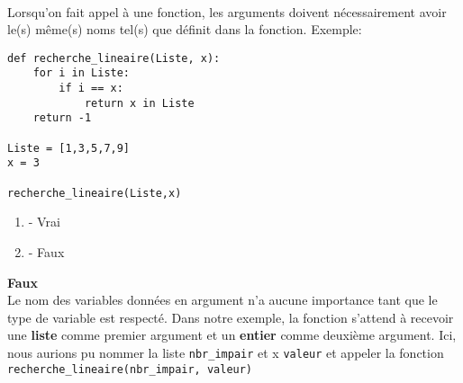 \begin{Exercice}[2 minutes]\\
Lorsqu'on fait appel à une fonction, les arguments doivent nécessairement avoir le(s) même(s) noms tel(s) que définit dans la fonction. Exemple:\\
\begin{lstlisting}
def recherche_lineaire(Liste, x):
    for i in Liste:
        if i == x:
            return x in Liste
    return -1

Liste = [1,3,5,7,9]
x = 3

recherche_lineaire(Liste,x)

\end{lstlisting}
\begin{enumerate}
    \item - Vrai
    \item - Faux
\end{enumerate}
\begin{solution}
    \textbf{Faux}\\
    Le nom des variables données en argument n'a aucune importance tant que le type de variable est respecté. Dans notre exemple, la fonction s'attend à recevoir  une \textbf{liste} comme premier argument et un \textbf{entier} comme deuxième argument. Ici, nous aurions pu nommer la liste \lstinline{nbr_impair} et x \lstinline{valeur} et appeler la fonction \lstinline{recherche_lineaire(nbr_impair, valeur)}

\end{solution}
\end{Exercice}

\begin{comment}
\begin{Exercice}[2 minutes]\\
Si le programme Python contient une erreur, celle-ci sera détectée avant l'exécution du programme. 

\begin{enumerate}
    \item - Vrai
    \item - Faux
\end{enumerate}
\begin{solution}
    \textbf{Faux}: En Python, les erreurs sont détectées pendant l'exécution du programme.
\end{solution}
\end{Exercice}
\end{comment}


